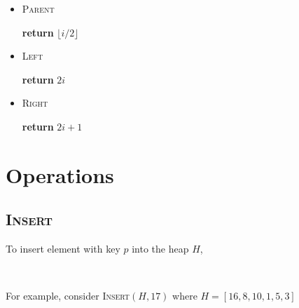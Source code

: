 \begin{minipage}[t]{0.3\linewidth} \begin{itemize}
    \item \textsc{Parent}
    
    \textbf{return} $\lfloor i / 2 \rfloor$
\end{itemize} \end{minipage}
\begin{minipage}[t]{0.3\linewidth} \begin{itemize}
    \item \textsc{Left}
    
    \textbf{return} $2i$
\end{itemize} \end{minipage}
\begin{minipage}[t]{0.3\linewidth} \begin{itemize}
    \item \textsc{Right}

    \textbf{return} $2i + 1$
\end{itemize} \end{minipage}

\section{Operations}
\subsection{\textsc{Insert}}

To insert element with key $p$ into the heap $H$, 


{~~~}

For example, consider \textsc{Insert}$(H, 17)$ where $H = [16, 8, 10, 1, 5, 3]$

